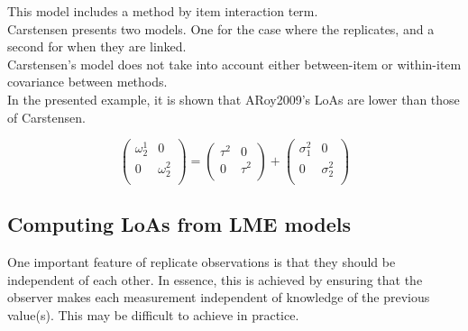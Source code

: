 \documentclass[12pt, a4paper]{report}
\theoremstyle{plain}
\theoremstyle{definition}
\theoremstyle{remark}
\begin{document}
	
	This model includes a method by item interaction term.\\
	
	Carstensen presents two models. One for the case where the replicates, and a second for when they are linked.\\
	Carstensen's model does not take into account either between-item or within-item covariance between methods.\\
	In the presented example, it is shown that ARoy2009's LoAs are lower than those of Carstensen.
	
	
	
	
	\[\left(\begin{array}{cc}
	\omega^1_2  & 0 \\
	0 & \omega^2_2 \\
	\end{array}  \right)
	=  \left(
	\begin{array}{cc}
	\tau^2  & 0 \\
	0 & \tau^2 \\
	\end{array} \right)+
	\left(
	\begin{array}{cc}
	\sigma^2_1  & 0 \\
	0 & \sigma^2_2 \\
	\end{array}\right)
	\]
	
	
	
	
	
	
	
	
	
	
	
	\subsection{Computing LoAs from LME models}
	
	
	One important feature of replicate observations is that they should be independent
	of each other. In essence, this is achieved by ensuring that the observer makes each
	measurement independent of knowledge of the previous value(s). This may be difficult
	to achieve in practice.
	
\end{document}
